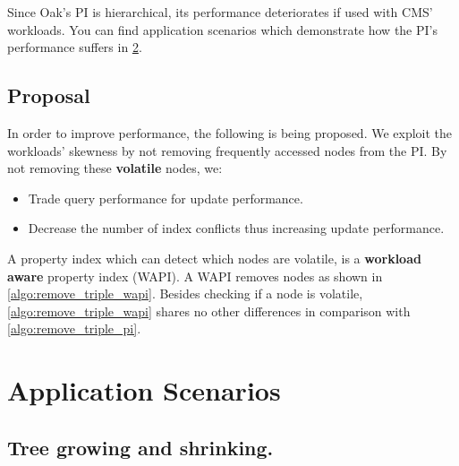 \documentclass[abstracton,12pt]{scrreprt}
\begin{document}
Since Oak's PI is hierarchical, its performance deteriorates if used with CMS' workloads.
You can find application scenarios which demonstrate how the PI's performance suffers in \cref{sec:application_scenarios}.

\section{Proposal}

In order to improve performance, the following is being proposed.
We exploit the workloads' skewness by not removing frequently accessed nodes from the PI.
By not removing these \textbf{volatile} nodes, we:
\begin{itemize}
    \item Trade query performance for update performance.
    \item Decrease the number of index conflicts thus increasing update performance.
\end{itemize}
A property index which can detect which nodes are volatile, is a \textbf{workload aware} property index (WAPI).
A WAPI removes nodes as shown in \cref{algo:remove_triple_wapi}.
Besides checking if a node is volatile, \cref{algo:remove_triple_wapi} shares no other differences in comparison with \cref{algo:remove_triple_pi}.


\chapter{Application Scenarios}
\label{sec:application_scenarios}

\section{Tree growing and shrinking.}
\end{document}
